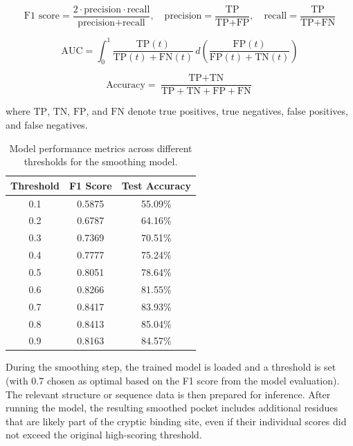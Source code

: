 \begin{equation}
\text{F1 score} = \frac{2 \cdot \text{precision} \cdot \text{recall}}{\text{precision} + \text{recall}}, \quad
\text{precision} = \frac{\text{TP}}{\text{TP} + \text{FP}}, \quad
\text{recall} = \frac{\text{TP}}{\text{TP} + \text{FN}}
\label{eq:f1-score}
\end{equation}

\begin{equation}
\text{AUC} = \int_0^1 \frac{\text{TP}(t)}{\text{TP}(t) + \text{FN}(t)} \, d\left( \frac{\text{FP}(t)}{\text{FP}(t) + \text{TN}(t)} \right)
\label{eq:auc}
\end{equation}

\begin{equation}
\text{Accuracy} = \frac{\text{TP} + \text{TN}}{\text{TP} + \text{TN} + \text{FP} + \text{FN}}
\label{eq:accuracy}
\end{equation}

where $\text{TP}$, $\text{TN}$, $\text{FP}$, and $\text{FN}$ denote true positives, true negatives, false positives, and false negatives.

\begin{table}[htbp]
    \centering
    \caption{Model performance metrics across different thresholds for the smoothing model.}
    \label{tab:smoothing-thresholds}
    \begin{tabular}{c|c|c}
        \hline
        \textbf{Threshold} & \textbf{F1 Score} & \textbf{Test Accuracy} \\
        \hline
        0.1 & 0.5875 & 55.09\% \\
        0.2 & 0.6787 & 64.16\% \\
        0.3 & 0.7369 & 70.51\% \\
        0.4 & 0.7777 & 75.24\% \\
        0.5 & 0.8051 & 78.64\% \\
        0.6 & 0.8266 & 81.55\% \\
        0.7 & 0.8417 & 83.93\% \\
        0.8 & 0.8413 & 85.04\% \\
        0.9 & 0.8163 & 84.57\% \\
        \hline
    \end{tabular}
\end{table}

During the smoothing step, the trained model is loaded and a threshold is set (with 0.7 chosen as optimal based on the F1 score from the model evaluation). The relevant structure or sequence data is then prepared for inference. After running the model, the resulting smoothed pocket includes additional residues that are likely part of the cryptic binding site, even if their individual scores did not exceed the original high-scoring threshold.


